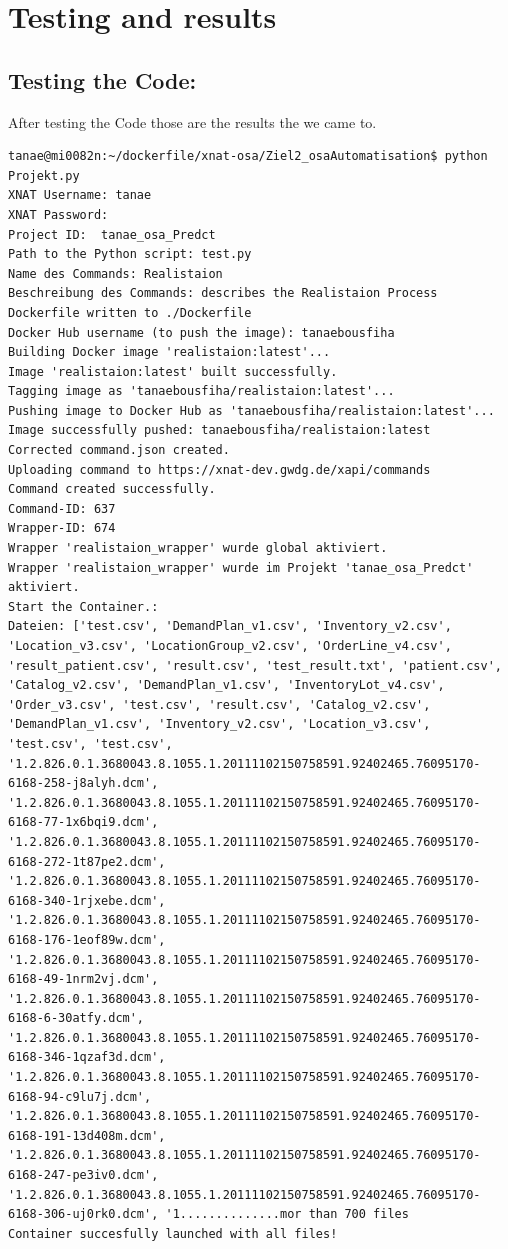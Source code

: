 \chapter{Testing and results}
\section{Testing the Code:}
After testing the Code those are the results the we came to. 
\begin{lstlisting}
tanae@mi0082n:~/dockerfile/xnat-osa/Ziel2_osaAutomatisation$ python Projekt.py
XNAT Username: tanae
XNAT Password:
Project ID:  tanae_osa_Predct
Path to the Python script: test.py
Name des Commands: Realistaion
Beschreibung des Commands: describes the Realistaion Process
Dockerfile written to ./Dockerfile
Docker Hub username (to push the image): tanaebousfiha
Building Docker image 'realistaion:latest'...
Image 'realistaion:latest' built successfully.
Tagging image as 'tanaebousfiha/realistaion:latest'...
Pushing image to Docker Hub as 'tanaebousfiha/realistaion:latest'...
Image successfully pushed: tanaebousfiha/realistaion:latest
Corrected command.json created.
Uploading command to https://xnat-dev.gwdg.de/xapi/commands
Command created successfully.
Command-ID: 637
Wrapper-ID: 674
Wrapper 'realistaion_wrapper' wurde global aktiviert.
Wrapper 'realistaion_wrapper' wurde im Projekt 'tanae_osa_Predct' aktiviert.
Start the Container.:
Dateien: ['test.csv', 'DemandPlan_v1.csv', 'Inventory_v2.csv', 'Location_v3.csv', 'LocationGroup_v2.csv', 'OrderLine_v4.csv', 'result_patient.csv', 'result.csv', 'test_result.txt', 'patient.csv', 'Catalog_v2.csv', 'DemandPlan_v1.csv', 'InventoryLot_v4.csv', 'Order_v3.csv', 'test.csv', 'result.csv', 'Catalog_v2.csv', 'DemandPlan_v1.csv', 'Inventory_v2.csv', 'Location_v3.csv', 'test.csv', 'test.csv', '1.2.826.0.1.3680043.8.1055.1.20111102150758591.92402465.76095170-6168-258-j8alyh.dcm', '1.2.826.0.1.3680043.8.1055.1.20111102150758591.92402465.76095170-6168-77-1x6bqi9.dcm', '1.2.826.0.1.3680043.8.1055.1.20111102150758591.92402465.76095170-6168-272-1t87pe2.dcm', '1.2.826.0.1.3680043.8.1055.1.20111102150758591.92402465.76095170-6168-340-1rjxebe.dcm', '1.2.826.0.1.3680043.8.1055.1.20111102150758591.92402465.76095170-6168-176-1eof89w.dcm', '1.2.826.0.1.3680043.8.1055.1.20111102150758591.92402465.76095170-6168-49-1nrm2vj.dcm', '1.2.826.0.1.3680043.8.1055.1.20111102150758591.92402465.76095170-6168-6-30atfy.dcm', '1.2.826.0.1.3680043.8.1055.1.20111102150758591.92402465.76095170-6168-346-1qzaf3d.dcm', '1.2.826.0.1.3680043.8.1055.1.20111102150758591.92402465.76095170-6168-94-c9lu7j.dcm', '1.2.826.0.1.3680043.8.1055.1.20111102150758591.92402465.76095170-6168-191-13d408m.dcm', '1.2.826.0.1.3680043.8.1055.1.20111102150758591.92402465.76095170-6168-247-pe3iv0.dcm', '1.2.826.0.1.3680043.8.1055.1.20111102150758591.92402465.76095170-6168-306-uj0rk0.dcm', '1..............mor than 700 files
Container succesfully launched with all files!
\end{lstlisting}
